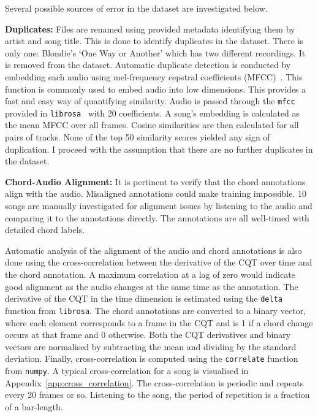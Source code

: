 Several possible sources of error in the dataset are investigated below.

\textbf{Duplicates:} Files are renamed using provided metadata identifying them by artist and song title. This is done to identify duplicates in the dataset. There is only one: Blondie's `One Way or Another' which has two different recordings. It is removed from the dataset. Automatic duplicate detection is conducted by embedding each audio using mel-frequency cepstral coefficients (MFCC)~\citep{MFCC}. This function is commonly used to embed audio into low dimensions. This provides a fast and easy way of quantifying similarity. Audio is passed through the \texttt{mfcc} provided in \texttt{librosa}~\citep{librosa} with 20 coefficients. A song's embedding is calculated as the mean MFCC over all frames. Cosine similarities are then calculated for all pairs of tracks. None of the top 50 similarity scores yielded any sign of duplication. I proceed with the assumption that there are no further duplicates in the dataset.

\textbf{Chord-Audio Alignment:} It is pertinent to verify that the chord annotations align with the audio. Misaligned annotations could make training impossible. 10 songs are manually investigated for alignment issues by listening to the audio and comparing it to the annotations directly. The annotations are all well-timed with detailed chord labels.

Automatic analysis of the alignment of the audio and chord annotations is also done using the cross-correlation between the derivative of the CQT over time and the chord annotation. A maximum correlation at a lag of zero would indicate good alignment as the audio changes at the same time as the annotation. The derivative of the CQT in the time dimension is estimated using the \texttt{delta} function from \texttt{librosa}. The chord annotations are converted to a binary vector, where each element corresponds to a frame in the CQT and is 1 if a chord change occurs at that frame and 0 otherwise. Both the CQT derivatives and binary vectors are normalised by subtracting the mean and dividing by the standard deviation. Finally, cross-correlation is computed using the \texttt{correlate} function from \texttt{numpy}. A typical cross-correlation for a song is visualised in Appendix~\ref{app:cross_correlation}. The cross-correlation is periodic and repeats every 20 frames or so. Listening to the song, the period of repetition is a fraction of a bar-length. 

